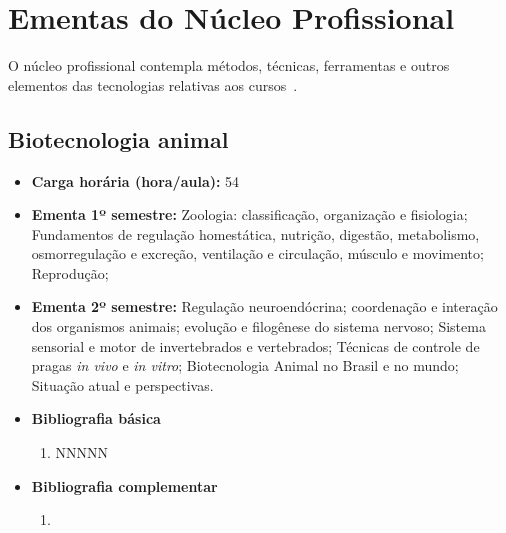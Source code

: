 \documentclass[11pt,fleqn]{book} %
\begin{document}
\newpage
\section{Ementas do Núcleo Profissional}\label{ementasTecnico}
\indent

O núcleo profissional contempla métodos, técnicas, ferramentas e outros elementos das tecnologias relativas aos cursos~\cite{Resolucao06De2012}.

\newpage
\subsection{Biotecnologia animal}\label{disc:biotecAnimal}
\begin{itemize}
	\item \textbf{Carga horária (hora/aula):} 54
	\item \textbf{Ementa 1º semestre:}	
	Zoologia: classificação, organização e fisiologia;
	Fundamentos de regulação homestática, nutrição, digestão, metabolismo, osmorregulação e excreção, ventilação e circulação, músculo e movimento;
	Reprodução; 
	\item \textbf{Ementa 2º semestre:}
	Regulação neuroendócrina; coordenação e interação dos organismos animais; evolução e filogênese do sistema nervoso; 
	Sistema sensorial e motor de invertebrados e vertebrados;	
	Técnicas de controle de pragas \textit{in vivo} e \textit{in vitro};
	Biotecnologia Animal no Brasil e no mundo; 
	Situação atual e perspectivas.
	\item \textbf{Bibliografia básica}
	\begin{enumerate}
		\item NNNNN
	\end{enumerate}
	\item \textbf{Bibliografia complementar}
	\begin{enumerate}
		\item 
	\end{enumerate}	
\end{itemize}

\newpage
\end{document}

